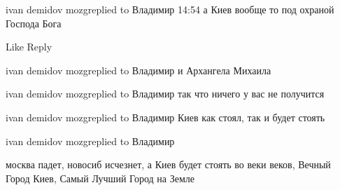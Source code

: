  
 
 
 
 

ivan demidov mozgreplied to Владимир
14:54
а Киев вообще то под охраной Господа Бога

    Like
    Reply

ivan demidov mozgreplied to Владимир
и Архангела Михаила

ivan demidov mozgreplied to Владимир
так что ничего у вас не получится

ivan demidov mozgreplied to Владимир
Киев как стоял, так и будет стоять

ivan demidov mozgreplied to Владимир

москва падет, новосиб исчезнет, а Киев будет стоять во веки веков, Вечный Город
Киев, Самый Лучший Город на Земле
